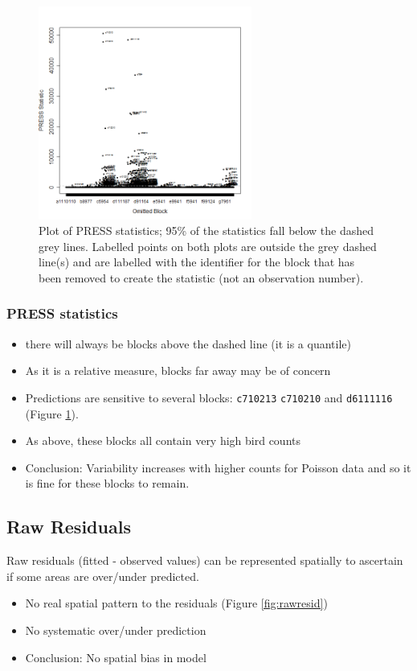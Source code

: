 \documentclass[11pt, a4paper]{article}
\begin{document}
\begin{frame}[fragile]
\begin{figure}[h]
  \centering
    \includegraphics[width=7cm]{InfluenceMeasures_press.png}
  \caption{Plot of PRESS statistics; 95\% of the statistics fall below the dashed grey lines.  Labelled points on both plots are outside the grey dashed line(s) and are labelled with the identifier for the block that has been removed to create the statistic (not an observation number).}
  \label{fig:influence2}
\end{figure}
\end{frame}


\begin{frame}
\frametitle{PRESS statistics}
\begin{itemize}
  \item there will always be blocks above the dashed line (it is a quantile)
  \item As it is a relative measure, blocks far away may be of concern
  \item Predictions are sensitive to several blocks: {\tt c710213} {\tt c710210} and {\tt d6111116} (Figure \ref{fig:influence2}).
  \item As above, these blocks all contain very high bird counts  
  \bigskip
  \item Conclusion: Variability increases with higher counts for Poisson data and so it is fine for these blocks to remain. 
\end{itemize}
\end{frame}

\subsection{Raw Residuals}
\begin{frame}[fragile]
Raw residuals (fitted - observed values) can be represented spatially to ascertain if some areas are over/under predicted.  

\begin{itemize}
\item No real spatial pattern to the residuals (Figure \ref{fig:rawresid})
\item No systematic over/under prediction
\bigskip
\item Conclusion: No spatial bias in model
\end{itemize}
\end{frame}
\end{document}
